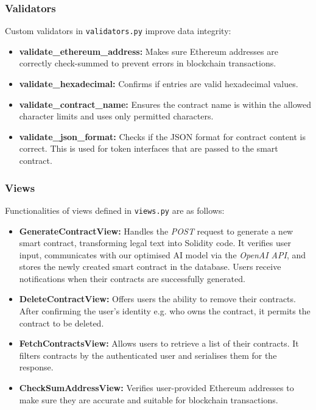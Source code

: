 \subsubsection{Validators}

Custom validators in \texttt{validators.py} improve data integrity:
\begin{itemize}
    \item \textbf{validate\_ethereum\_address:} Makes sure Ethereum addresses are correctly check-summed to prevent errors in blockchain transactions.
    \item \textbf{validate\_hexadecimal:} Confirms if entries are valid hexadecimal values.
    \item \textbf{validate\_contract\_name:} Ensures the contract name is within the allowed character limits and uses only permitted characters.
    \item \textbf{validate\_json\_format:} Checks if the JSON format for contract content is correct. This is used for token interfaces that are passed to the smart contract.
\end{itemize}

\subsubsection{Views}

Functionalities of views defined in \texttt{views.py} are as follows:
\begin{itemize}
    \item \textbf{GenerateContractView:} Handles the \textit{POST} request to generate a new smart contract, transforming legal text into Solidity code. It verifies user input, communicates with our optimised AI model via the \textit{OpenAI API}, and stores the newly created smart contract in the database. Users receive notifications when their contracts are successfully generated.
    \item \textbf{DeleteContractView:} Offers users the ability to remove their contracts. After confirming the user's identity e.g. who owns the contract, it permits the contract to be deleted.
    \item \textbf{FetchContractsView:}  Allows users to retrieve a list of their contracts. It filters contracts by the authenticated user and serialises them for the response.
    \item \textbf{CheckSumAddressView:} Verifies user-provided Ethereum addresses to make sure they are accurate and suitable for blockchain transactions.
\end{itemize}

